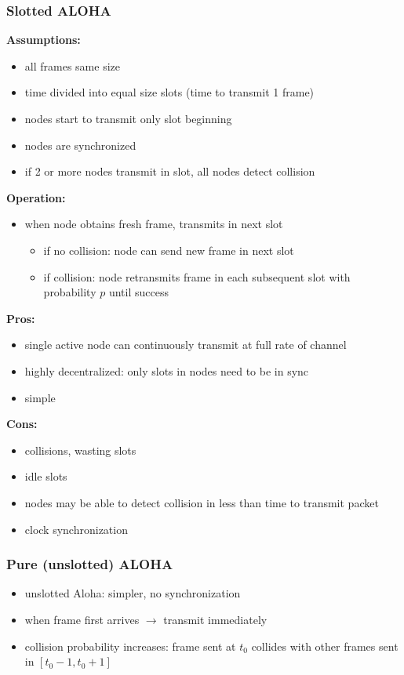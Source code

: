 \subsubsection{Slotted ALOHA}
\textbf{Assumptions:}
\begin{itemize}
	\item all frames same size
	\item time divided into equal size slots (time to transmit 1 frame)
	\item nodes start to transmit only slot beginning
	\item nodes are synchronized
	\item if 2 or more nodes transmit in slot, all nodes detect collision
\end{itemize}
\textbf{Operation:}
\begin{itemize}
	\item when node obtains fresh frame, transmits in next slot
	\begin{itemize}
		\item if no collision: node can send new frame in next slot
		\item if collision: node retransmits frame in each subsequent slot with probability $p$ until success
	\end{itemize}
\end{itemize}
\textbf{Pros:}
\begin{itemize}
	\item single active node can continuously transmit at full rate of channel
	\item highly decentralized: only slots in nodes need to be in sync
	\item simple
\end{itemize}
\textbf{Cons:}
\begin{itemize}
	\item collisions, wasting slots
	\item idle slots
	\item nodes may be able to detect collision in less than time to transmit packet
	\item clock synchronization
\end{itemize}
\subsubsection{Pure (unslotted) ALOHA}
\begin{itemize}
	\item unslotted Aloha: simpler, no synchronization
	\item when frame first arrives $\rightarrow$ transmit immediately
	\item collision probability increases: frame sent at $t_0$ collides with other frames sent in $[t_0-1,t_0+1]$
\end{itemize}
